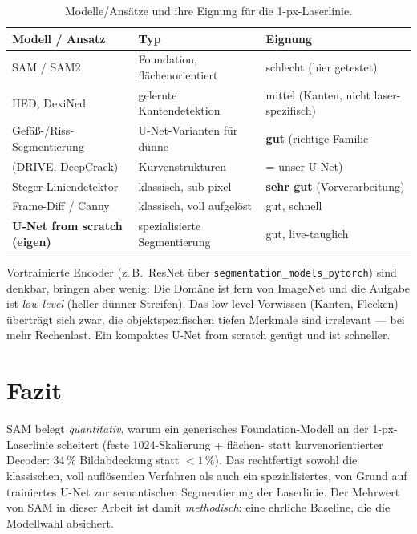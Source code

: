 \documentclass[11pt,a4paper]{article}
\begin{document}
\begin{table}[h]
  \centering
  \caption{Modelle/Ansätze und ihre Eignung für die 1-px-Laserlinie.}
  \label{tab:andere}
  \begin{tabular}{lll}
    \toprule
    \textbf{Modell / Ansatz} & \textbf{Typ} & \textbf{Eignung} \\
    \midrule
    SAM / SAM2 & Foundation, flächenorientiert & schlecht (hier getestet) \\
    HED, DexiNed & gelernte Kantendetektion & mittel (Kanten, nicht laser-spezifisch) \\
    Gefäß-/Riss-Segmentierung & U-Net-Varianten für dünne & \textbf{gut} (richtige Familie \\
    \;(DRIVE, DeepCrack) & Kurvenstrukturen & \;= unser U-Net) \\
    Steger-Liniendetektor & klassisch, sub-pixel & \textbf{sehr gut} (Vorverarbeitung) \\
    Frame-Diff / Canny & klassisch, voll aufgelöst & gut, schnell \\
    \textbf{U-Net from scratch (eigen)} & spezialisierte Segmentierung & gut, live-tauglich \\
    \bottomrule
  \end{tabular}
\end{table}

\noindent
Vortrainierte Encoder (z.\,B.\ ResNet über \texttt{segmentation\_models\_pytorch})
sind denkbar, bringen aber wenig: Die Domäne ist fern von ImageNet und die Aufgabe
ist \emph{low-level} (heller dünner Streifen). Das low-level-Vorwissen (Kanten,
Flecken) überträgt sich zwar, die objektspezifischen tiefen Merkmale sind irrelevant
--- bei mehr Rechenlast. Ein kompaktes U-Net from scratch genügt und ist schneller.

\section{Fazit}
SAM belegt \emph{quantitativ}, warum ein generisches Foundation-Modell an der
1-px-Laserlinie scheitert (feste 1024-Skalierung + flächen- statt kurvenorientierter
Decoder: 34\,\% Bildabdeckung statt $<1\,\%$). Das rechtfertigt sowohl die
klassischen, voll auflösenden Verfahren als auch ein spezialisiertes, von Grund auf
trainiertes U-Net zur semantischen Segmentierung der Laserlinie. Der Mehrwert von
SAM in dieser Arbeit ist damit \emph{methodisch}: eine ehrliche Baseline, die die
Modellwahl absichert.
\end{document}
